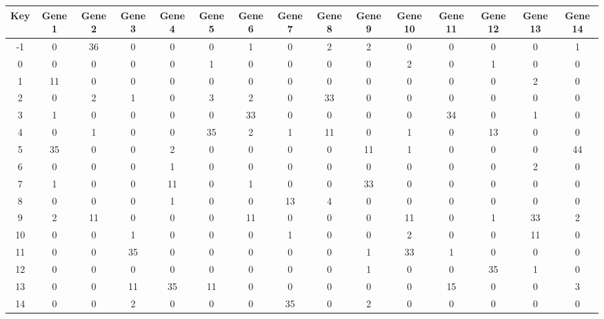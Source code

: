 \begin{tabular}{|c|c|c|c|c|c|c|c|c|c|c|c|c|c|c|}
\hline
Key & Gene 1 & Gene 2 & Gene 3 & Gene 4 & Gene 5 & Gene 6 & Gene 7 & Gene 8 & Gene 9 & Gene 10 & Gene 11 & Gene 12 & Gene 13 & Gene 14 \\
\hline
-1 & 0 & 36 & 0 & 0 & 0 & 1 & 0 & 2 & 2 & 0 & 0 & 0 & 0 & 1 \\
0 & 0 & 0 & 0 & 0 & 1 & 0 & 0 & 0 & 0 & 2 & 0 & 1 & 0 & 0 \\
1 & 11 & 0 & 0 & 0 & 0 & 0 & 0 & 0 & 0 & 0 & 0 & 0 & 2 & 0 \\
2 & 0 & 2 & 1 & 0 & 3 & 2 & 0 & 33 & 0 & 0 & 0 & 0 & 0 & 0 \\
3 & 1 & 0 & 0 & 0 & 0 & 33 & 0 & 0 & 0 & 0 & 34 & 0 & 1 & 0 \\
4 & 0 & 1 & 0 & 0 & 35 & 2 & 1 & 11 & 0 & 1 & 0 & 13 & 0 & 0 \\
5 & 35 & 0 & 0 & 2 & 0 & 0 & 0 & 0 & 11 & 1 & 0 & 0 & 0 & 44 \\
6 & 0 & 0 & 0 & 1 & 0 & 0 & 0 & 0 & 0 & 0 & 0 & 0 & 2 & 0 \\
7 & 1 & 0 & 0 & 11 & 0 & 1 & 0 & 0 & 33 & 0 & 0 & 0 & 0 & 0 \\
8 & 0 & 0 & 0 & 1 & 0 & 0 & 13 & 4 & 0 & 0 & 0 & 0 & 0 & 0 \\
9 & 2 & 11 & 0 & 0 & 0 & 11 & 0 & 0 & 0 & 11 & 0 & 1 & 33 & 2 \\
10 & 0 & 0 & 1 & 0 & 0 & 0 & 1 & 0 & 0 & 2 & 0 & 0 & 11 & 0 \\
11 & 0 & 0 & 35 & 0 & 0 & 0 & 0 & 0 & 1 & 33 & 1 & 0 & 0 & 0 \\
12 & 0 & 0 & 0 & 0 & 0 & 0 & 0 & 0 & 1 & 0 & 0 & 35 & 1 & 0 \\
13 & 0 & 0 & 11 & 35 & 11 & 0 & 0 & 0 & 0 & 0 & 15 & 0 & 0 & 3 \\
14 & 0 & 0 & 2 & 0 & 0 & 0 & 35 & 0 & 2 & 0 & 0 & 0 & 0 & 0 \\
\hline
\end{tabular}